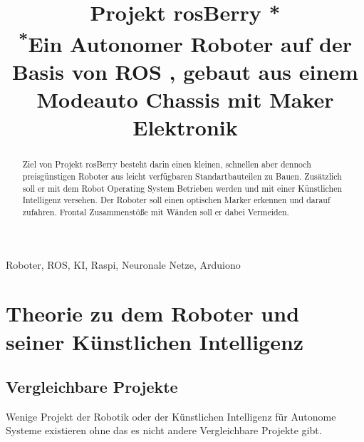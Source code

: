 \documentclass[conference]{IEEEtran}
\begin{document}
	
	\title{Projekt rosBerry *\\
		{\footnotesize \textsuperscript{*}Ein Autonomer Roboter auf der Basis von ROS , gebaut aus einem Modeauto Chassis mit Maker Elektronik}}
	
	\author{
		\and
		\and
	}
	
	\maketitle
	
	\begin{abstract}
		Ziel von Projekt rosBerry besteht darin einen kleinen, schnellen aber dennoch preisgünstigen Roboter aus leicht verfügbaren Standartbauteilen zu Bauen. Zusätzlich soll er mit dem Robot Operating System Betrieben werden und mit einer Künstlichen Intelligenz versehen. Der Roboter soll einen optischen Marker erkennen und darauf zufahren. Frontal Zusammenstöße mit Wänden soll er dabei Vermeiden. 
	\end{abstract}
	
	\begin{IEEEkeywords}
		Roboter, ROS, KI, Raspi, Neuronale Netze, Arduiono
	\end{IEEEkeywords}
	
	\section{Theorie zu dem Roboter und seiner Künstlichen Intelligenz}
	
	\subsection{Vergleichbare Projekte}	%
	Wenige Projekt der Robotik oder der Künstlichen Intelligenz für Autonome Systeme  existieren ohne das es nicht andere Vergleichbare Projekte gibt. \\
	
\end{document}
